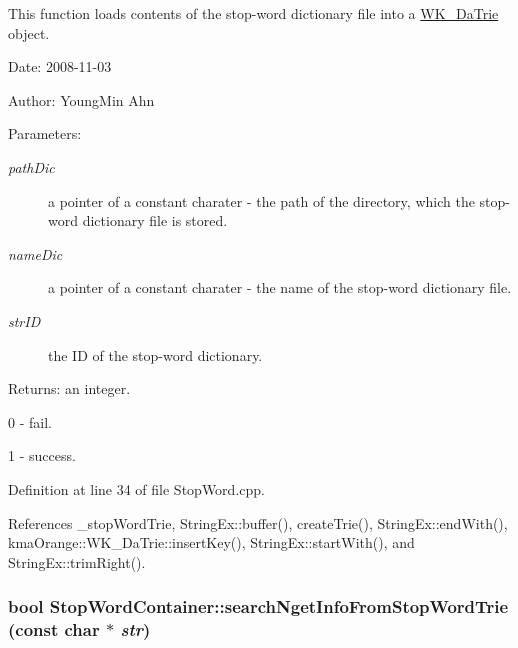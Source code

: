 This function loads contents of the stop-word dictionary file into a \hyperlink{classkmaOrange_1_1WK__DaTrie}{WK\_\-DaTrie} object. 

\begin{Desc}
\item[Date:]2008-11-03 \end{Desc}
\begin{Desc}
\item[Author:]YoungMin Ahn \end{Desc}
\begin{Desc}
\item[Parameters:]
\begin{description}
\item[{\em pathDic}]a pointer of a constant charater - the path of the directory, which the stop-word dictionary file is stored. \item[{\em nameDic}]a pointer of a constant charater - the name of the stop-word dictionary file. \item[{\em strID}]the ID of the stop-word dictionary. \end{description}
\end{Desc}
\begin{Desc}
\item[Returns:]an integer.\par
 0 - fail.\par
 1 - success. \end{Desc}


Definition at line 34 of file StopWord.cpp.

References \_\-stopWordTrie, StringEx::buffer(), createTrie(), StringEx::endWith(), kmaOrange::WK\_\-DaTrie::insertKey(), StringEx::startWith(), and StringEx::trimRight().\hypertarget{classkmaOrange_1_1StopWordContainer_a2bd1c44212a17f7ae12de9287860ad1}{
\subsubsection[{searchNgetInfoFromStopWordTrie}]{\setlength{\rightskip}{0pt plus 5cm}bool StopWordContainer::searchNgetInfoFromStopWordTrie (const char $\ast$ {\em str})}}
\label{classkmaOrange_1_1StopWordContainer_a2bd1c44212a17f7ae12de9287860ad1}


